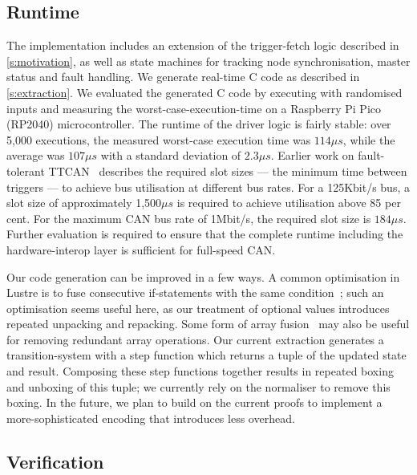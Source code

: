 \subsection{Runtime}

The implementation includes an extension of the trigger-fetch logic described in \autoref{s:motivation}, as well as state machines for tracking node synchronisation, master status and fault handling.
We generate real-time C code as described in \autoref{s:extraction}.
We evaluated the generated C code by executing with randomised inputs and measuring the worst-case-execution-time on a Raspberry Pi Pico (RP2040) microcontroller.
The runtime of the driver logic is fairly stable: over 5,000 executions, the measured worst-case execution time was $114\mu{}s$, while the average was $107\mu{}s$ with a standard deviation of $2.3\mu{}s$.
Earlier work on fault-tolerant TTCAN~\cite{short2007fault} describes the required slot sizes --- the minimum time between triggers --- to achieve bus utilisation at different bus rates.
For a 125Kbit/s bus, a slot size of approximately 1,500$\mu{}s$ is required to achieve utilisation above 85 per cent.
For the maximum CAN bus rate of 1Mbit/s, the required slot size is $184\mu{}s$.
Further evaluation is required to ensure that the complete runtime including the hardware-interop layer is sufficient for full-speed CAN.

Our code generation can be improved in a few ways.
A common optimisation in Lustre is to fuse consecutive if-statements with the same condition~\cite{bourke2017formally}; such an optimisation seems useful here, as our treatment of optional values introduces repeated unpacking and repacking.
Some form of array fusion~\cite{robinson2017machine} may also be useful for removing redundant array operations.
Our current extraction generates a transition-system with a step function which returns a tuple of the updated state and result.
Composing these step functions together results in repeated boxing and unboxing of this tuple; we currently rely on the \fstar{} normaliser to remove this boxing.
In the future, we plan to build on the current proofs to implement a more-sophisticated encoding that introduces less overhead.

\subsection{Verification}

